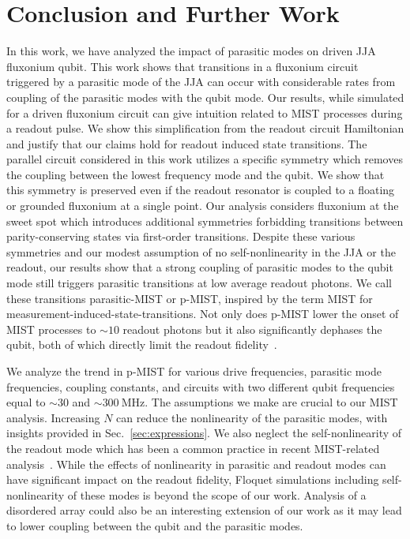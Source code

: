 \documentclass[%
reprint,
superscriptaddress,
 amsmath,amssymb,
 aps,
 prx,
longbibliography,
floatfix,
]{revtex4-2}
\begin{document}
\section{Conclusion and Further Work}\label{sec:conclusion}
In this work, we have analyzed the impact of parasitic modes on driven JJA fluxonium qubit. This work shows that transitions in a fluxonium circuit triggered by a parasitic mode of the JJA can occur with considerable rates from coupling of the parasitic modes with the qubit mode. Our results, while simulated for a driven fluxonium circuit can give intuition related to MIST processes during a readout pulse. We show this simplification from the readout circuit Hamiltonian and justify that our claims hold for readout induced state transitions. The parallel circuit considered in this work utilizes a specific symmetry which removes the coupling between the lowest frequency mode and the qubit. We show that this symmetry is preserved even if the readout resonator is coupled to a floating or grounded fluxonium at a single point. Our analysis considers fluxonium at the sweet spot which introduces additional symmetries forbidding transitions between parity-conserving states via first-order transitions. Despite these various symmetries and our modest assumption of no self-nonlinearity in the JJA or the readout, our results show that a strong coupling of parasitic modes to the qubit mode still triggers parasitic transitions at low average readout photons. We call these transitions parasitic-MIST or p-MIST, inspired by the term MIST for measurement-induced-state-transitions. Not only does p-MIST lower the onset of MIST processes to $\sim 10$ readout photons but it also significantly dephases the qubit, both of which directly limit the readout fidelity~\cite{hazra2024benchmarking}. 


We analyze the trend in p-MIST for various drive frequencies, parasitic mode frequencies, coupling constants, and circuits with two different qubit frequencies equal to $\sim 30$ and $\sim 300 \ \mathrm{MHz}$. The assumptions we make are crucial to our MIST analysis. Increasing $N$ can reduce the nonlinearity of the parasitic modes, with insights provided in Sec.~\ref{sec:expressions}. We also neglect the self-nonlinearity of the readout mode which has been a common practice in recent MIST-related analysis~\cite{shillito2022dynamics,dumas2024unified,cohen2023reminiscence}. While the effects of nonlinearity in parasitic and readout modes can have significant impact on the readout fidelity, Floquet simulations including self-nonlinearity of these modes is beyond the scope of our work. Analysis of a disordered array could also be an interesting extension of our work as it may lead to lower coupling between the qubit and the parasitic modes. 
\end{document}
